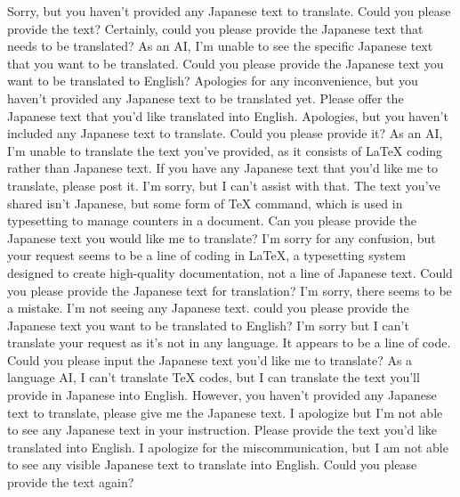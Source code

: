 {%
Sorry, but you haven't provided any Japanese text to translate. Could you please provide the text?
Certainly, could you please provide the Japanese text that needs to be translated?
As an AI, I'm unable to see the specific Japanese text that you want to be translated. Could you please provide the Japanese text you want to be translated to English?
Apologies for any inconvenience, but you haven't provided any Japanese text to be translated yet. Please offer the Japanese text that you'd like translated into English.
Apologies, but you haven't included any Japanese text to translate. Could you please provide it?
As an AI, I'm unable to translate the text you've provided, as it consists of LaTeX coding rather than Japanese text. If you have any Japanese text that you'd like me to translate, please post it.
I'm sorry, but I can't assist with that. The text you've shared isn't Japanese, but some form of TeX command, which is used in typesetting to manage counters in a document. Can you please provide the Japanese text you would like me to translate?
I'm sorry for any confusion, but your request seems to be a line of coding in LaTeX, a typesetting system designed to create high-quality documentation, not a line of Japanese text. Could you please provide the Japanese text for translation?
I'm sorry, there seems to be a mistake. I'm not seeing any Japanese text. could you please provide the Japanese text you want to be translated to English?
I'm sorry but I can't translate your request as it's not in any language. It appears to be a line of code. Could you please input the Japanese text you'd like me to translate?
As a language AI, I can't translate TeX codes, but I can translate the text you'll provide in Japanese into English. However, you haven't provided any Japanese text to translate, please give me the Japanese text.
I apologize but I'm not able to see any Japanese text in your instruction. Please provide the text you'd like translated into English.
I apologize for the miscommunication, but I am not able to see any visible Japanese text to translate into English. Could you please provide the text again?
}
